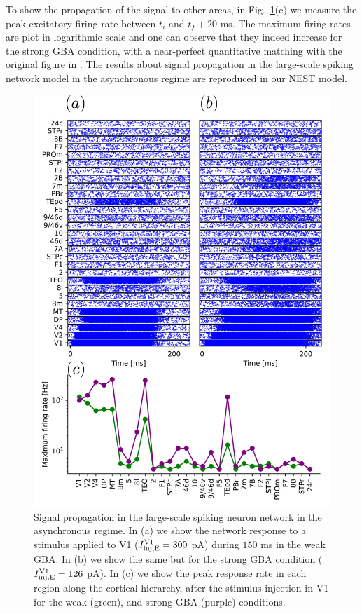 To show the propagation of the signal to other areas, in Fig.~\ref{fig:fig3}(c) we measure the peak excitatory firing rate between $t_{i}$ and $t_{f}+20$ ms. The maximum firing rates are plot in logarithmic scale and one can observe that they indeed increase for the strong GBA condition, with a near-perfect quantitative matching with the original figure in \cite{joglekar2018inter}. The results about signal propagation in the large-scale spiking network model in the asynchronous regime are  reproduced in our NEST model.

\begin{figure}[!ht]
 \centering
 \includegraphics[scale=0.6]{figures/fig5.pdf}
 \caption{Signal propagation in the large-scale spiking neuron network in the asynchronous regime. In (a) we show the network response to a stimulus applied to V1 ($I_{\rm inj, E}^{\rm V1} = 300$ pA) during $150$ ms in the weak GBA. In (b) we show the same but for the strong GBA  condition ($I_{\rm inj, E}^{\rm V1} = 126$ pA). In (c) we show the peak response rate in each region along the cortical hierarchy, after the stimulus injection in V1 for the weak (green), and strong GBA (purple) conditions. }\label{fig:fig3}
\end{figure}



